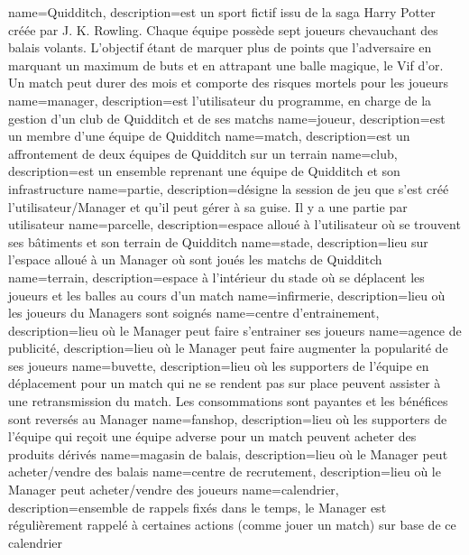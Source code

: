 {
  name=Quidditch,
  description={est un sport fictif issu de la saga
Harry Potter
créée par
J. K. Rowling.
Chaque équipe possède sept joueurs chevauchant des
balais volants. L'objectif étant de
marquer plus de points que l'adversaire en
marquant un maximum de buts et en
attrapant une balle magique, le
Vif d'or. Un match peut durer des mois et comporte des
risques mortels pour les joueurs}
}
{
  name=manager,
  description={est l'utilisateur du programme, en charge de la gestion d'un club de Quidditch
  et de ses matchs}
}
{
  name=joueur,
  description={est un membre d'une équipe de Quidditch}
}
{
  name=match,
  description={est un affrontement de deux équipes de Quidditch sur un terrain}
}
{
  name=club,
  description={est un ensemble reprenant une équipe de Quidditch et son infrastructure}
}
{
  name=partie,
  description={désigne la session de jeu que s'est créé l'utilisateur/Manager et qu'il peut gérer à sa guise. Il y a une partie par utilisateur}
}
{
  name=parcelle,
  description={espace alloué à l'utilisateur où se trouvent ses bâtiments et son terrain de Quidditch}
}
{
  name=stade,
  description={lieu sur l’espace alloué à un Manager où sont joués les matchs de Quidditch}
}
{
  name=terrain,
  description={espace à l'intérieur du stade où se déplacent les joueurs et les balles au cours d'un match}
}
{
  name=infirmerie,
  description={lieu où les joueurs du Managers sont soignés}
}
{
  name=centre d’entrainement,
  description={lieu où le Manager peut faire s'entrainer ses joueurs}
}
{
  name=agence de publicité,
  description={lieu où le Manager peut faire augmenter la popularité de ses joueurs}
}
{
  name=buvette,
  description={lieu où les supporters de l'équipe en déplacement pour un match qui ne se rendent pas sur place peuvent assister à une retransmission du match. Les consommations sont payantes et les bénéfices sont reversés au Manager}
}
{
  name=fanshop,
  description={lieu où les supporters de l'équipe qui reçoit une équipe adverse pour un match peuvent acheter des produits dérivés}
}
{
  name=magasin de balais,
  description={lieu où le Manager peut acheter/vendre des balais}
}
{
  name=centre de recrutement,
  description={lieu où le Manager peut acheter/vendre des joueurs}
}
{
  name=calendrier,
  description={ensemble de rappels fixés dans le temps, le Manager est régulièrement rappelé à certaines actions (comme jouer un match) sur base de ce calendrier}
}

